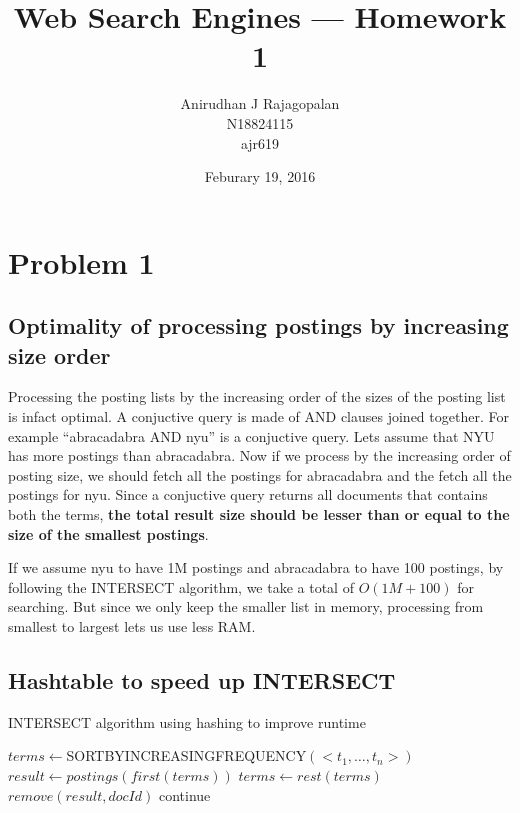 \documentclass{article}
\begin{document}
\title{Web Search Engines --- Homework 1}
\date{Feburary 19, 2016}
\author{Anirudhan J Rajagopalan\\ N18824115\\ ajr619}
\maketitle
\newpage

\section[A]{Problem 1}
\subsection{Optimality of processing postings by increasing size order}
Processing the posting lists by the increasing order of the sizes of the posting list is infact optimal.  A conjuctive query is made of AND clauses joined together.  For example ``abracadabra AND nyu'' is a conjuctive query.  Lets assume that NYU has more postings than abracadabra.  Now if we process by the increasing order of posting size, we should fetch all the postings for abracadabra and the fetch all the postings for nyu.  Since a conjuctive query returns all documents that contains both the terms, \textbf{the total result size should be lesser than or equal to the size of the smallest postings}.

If we assume nyu to have 1M postings and abracadabra to have 100 postings, by following the INTERSECT algorithm, we take a total of $O(1M  + 100)$ for searching.  But since we only keep the smaller list in memory, processing from smallest to largest lets us use less RAM\@.

\subsection{Hashtable to speed up INTERSECT}
\begin{algorithm}
  \caption{INTERSECT algorithm using hashing to improve runtime\label{alg:intersect-with-hashing}}
  \begin{algorithmic}[1]
      \State{} $terms \gets $SORTBYINCREASINGFREQUENCY$(<t_{1}, \ldots , t_{n}>)$
      \State{} $result \gets postings(first(terms)) $
      \State{} $terms \gets rest(terms) $
            \State{} $remove(result, docId)$
            \State{} continue
          \EndIf{}
        \EndFor{}
      \EndFor{}
      \State{} 
    \EndFunction{}
  \end{algorithmic}
\end{algorithm}
\end{document}

